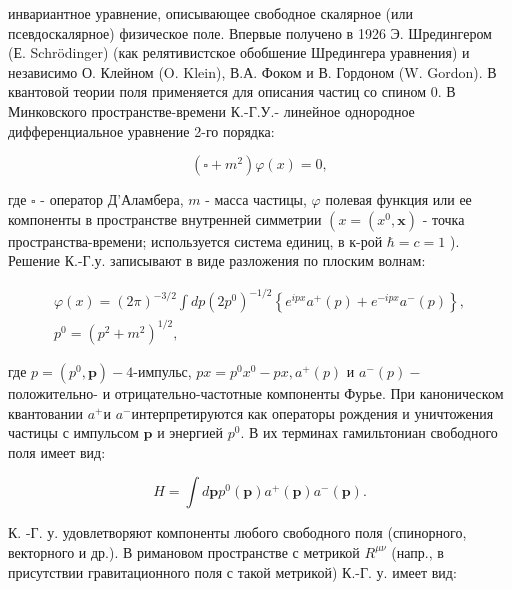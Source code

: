 \documentclass[10pt]{article}
\begin{document}
инвариантное уравнение, описывающее свободное скалярное (или псевдоскалярное) физическое поле. Впервые получено в 1926 Э. Шредингером (Е. Schrödinger) (как релятивистское обобшение Шредингера уравнения) и независимо О. Клейном (O. Klein), В.А. Фоком и В. Гордоном (W. Gordon). В квантовой теории поля применяется для описания частиц со спином 0. В Минковского пространстве-времени К.-Г.У.- линейное однородное дифференциальное уравнение 2-го порядка:



\[

\left(\square+m^{2}\right) \varphi(x)=0,

\]



где $\square$ - оператор Д'Аламбера, $m$ - масса частицы, $\varphi$ полевая функция или ее компоненты в пространстве внутренней симметрии $\left(x=\left(x^{0}, \boldsymbol{x}\right)\right.$ - точка пространства-времени; используется система единиц, в к-рой $\hbar=c=1$ ). Решение К.-Г.у. записывают в виде разложения по плоским волнам:



\[

\begin{gathered}

\varphi(x)=(2 \pi)^{-3 / 2} \int d p\left(2 p^{0}\right)^{-1 / 2}\left\{e^{i p x} a^{+}(p)+e^{-i p x} a^{-}(p)\right\}, \\

p^{0}=\left(p^{2}+m^{2}\right)^{1 / 2},

\end{gathered}

\]



где $p=\left(p^{0}, \boldsymbol{p}\right)-4$-импульс, $p x=p^{0} x^{0}-p x, a^{+}(p)$ и $a^{-}(p)-$ положительно- и отрицательно-частотные компоненты Фурье. При каноническом квантовании $a^{+}$и $a^{-}$интерпретируются как операторы рождения и уничтожения частицы с импульсом $\boldsymbol{p}$ и энергией $p^{0}$. В их терминах гамильтониан свободного поля имеет вид:



\[

H=\int d \boldsymbol{p} p^{0}(\boldsymbol{p}) a^{+}(\boldsymbol{p}) a^{-}(\boldsymbol{p}) .

\]



К. -Г. у. удовлетворяют компоненты любого свободного поля (спинорного, векторного и др.). В римановом пространстве с метрикой $R^{\mu \nu}$ (напр., в присутствии гравитационного поля с такой метрикой) К.-Г. у. имеет вид:
\end{document}
